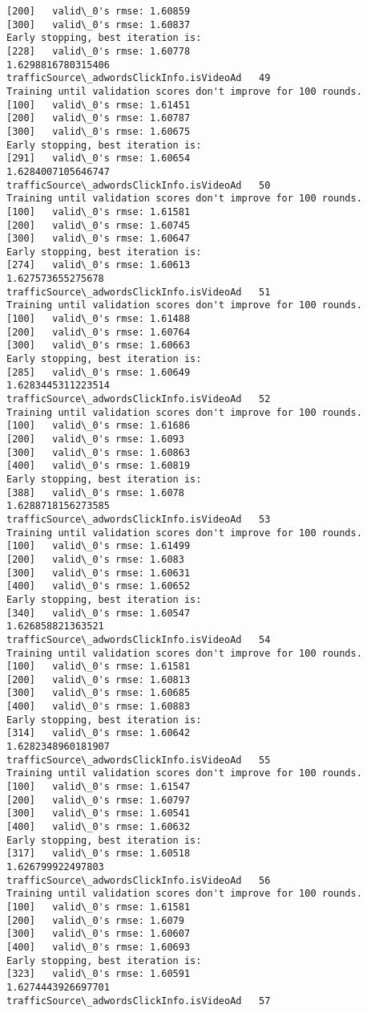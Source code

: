 \documentclass[11pt]{article}
\begin{document}
\begin{Verbatim}[commandchars=\\\{\}]
[200]	valid\_0's rmse: 1.60859
[300]	valid\_0's rmse: 1.60837
Early stopping, best iteration is:
[228]	valid\_0's rmse: 1.60778
1.6298816780315406
trafficSource\_adwordsClickInfo.isVideoAd   49
Training until validation scores don't improve for 100 rounds.
[100]	valid\_0's rmse: 1.61451
[200]	valid\_0's rmse: 1.60787
[300]	valid\_0's rmse: 1.60675
Early stopping, best iteration is:
[291]	valid\_0's rmse: 1.60654
1.6284007105646747
trafficSource\_adwordsClickInfo.isVideoAd   50
Training until validation scores don't improve for 100 rounds.
[100]	valid\_0's rmse: 1.61581
[200]	valid\_0's rmse: 1.60745
[300]	valid\_0's rmse: 1.60647
Early stopping, best iteration is:
[274]	valid\_0's rmse: 1.60613
1.627573655275678
trafficSource\_adwordsClickInfo.isVideoAd   51
Training until validation scores don't improve for 100 rounds.
[100]	valid\_0's rmse: 1.61488
[200]	valid\_0's rmse: 1.60764
[300]	valid\_0's rmse: 1.60663
Early stopping, best iteration is:
[285]	valid\_0's rmse: 1.60649
1.6283445311223514
trafficSource\_adwordsClickInfo.isVideoAd   52
Training until validation scores don't improve for 100 rounds.
[100]	valid\_0's rmse: 1.61686
[200]	valid\_0's rmse: 1.6093
[300]	valid\_0's rmse: 1.60863
[400]	valid\_0's rmse: 1.60819
Early stopping, best iteration is:
[388]	valid\_0's rmse: 1.6078
1.6288718156273585
trafficSource\_adwordsClickInfo.isVideoAd   53
Training until validation scores don't improve for 100 rounds.
[100]	valid\_0's rmse: 1.61499
[200]	valid\_0's rmse: 1.6083
[300]	valid\_0's rmse: 1.60631
[400]	valid\_0's rmse: 1.60652
Early stopping, best iteration is:
[340]	valid\_0's rmse: 1.60547
1.626858821363521
trafficSource\_adwordsClickInfo.isVideoAd   54
Training until validation scores don't improve for 100 rounds.
[100]	valid\_0's rmse: 1.61581
[200]	valid\_0's rmse: 1.60813
[300]	valid\_0's rmse: 1.60685
[400]	valid\_0's rmse: 1.60883
Early stopping, best iteration is:
[314]	valid\_0's rmse: 1.60642
1.6282348960181907
trafficSource\_adwordsClickInfo.isVideoAd   55
Training until validation scores don't improve for 100 rounds.
[100]	valid\_0's rmse: 1.61547
[200]	valid\_0's rmse: 1.60797
[300]	valid\_0's rmse: 1.60541
[400]	valid\_0's rmse: 1.60632
Early stopping, best iteration is:
[317]	valid\_0's rmse: 1.60518
1.626799922497803
trafficSource\_adwordsClickInfo.isVideoAd   56
Training until validation scores don't improve for 100 rounds.
[100]	valid\_0's rmse: 1.61581
[200]	valid\_0's rmse: 1.6079
[300]	valid\_0's rmse: 1.60607
[400]	valid\_0's rmse: 1.60693
Early stopping, best iteration is:
[323]	valid\_0's rmse: 1.60591
1.6274443926697701
trafficSource\_adwordsClickInfo.isVideoAd   57

\end{Verbatim}
\end{document}
